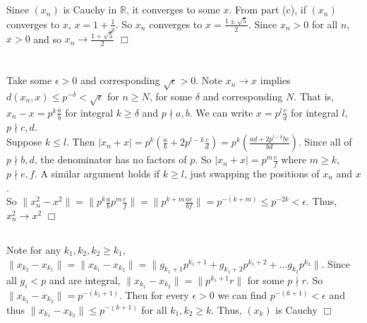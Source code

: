 \documentclass{article}
\begin{document}
\subsection{}
Since $(x_n)$ is Cauchy in $\mathbb{R}$, it converges to some $x$. From part (c), if $(x_n)$ converges to $x$, $x = 1 + \frac{1}{x}$. So $x_n$ converges to $x = \frac{1 \pm \sqrt{5}}{2}$. Since $x_n > 0$ for all $n$, $x>0$ and so $x_n \rightarrow \frac{1+\sqrt{5}}{2}$ $\Box$

\section{}
\subsection{}
Take some $\epsilon > 0$ and corresponding $\sqrt{\epsilon} > 0$. Note $x_n \rightarrow x$ implies $d(x_n,x) \leq p^{-\delta} < \sqrt{\epsilon}$ for $n\geq N$, for some $\delta$ and corresponding $N$. That is, $x_n-x = p^k\frac{a}{b}$ for integral $k\geq \delta$ and $p\nmid a,b$. We can write $x = p^l\frac{c}{d}$ for integral $l$, $p \nmid c,d$.\\
Suppose $k\leq l$. Then $|x_n+x| = p^k(\frac{a}{b} + 2p^{l-k}\frac{c}{d}) = p^k(\frac{ad + 2p^{l-k}bc}{bd})$. Since all of $p\nmid b,d$, the denominator has no factors of $p$. So $|x_n+x| = p^m\frac{e}{f}$ where $m\geq k$, $p \nmid e,f$. A similar argument holds if $k\geq l$, just swapping the positions of $x_n$ and $x$.\\
So $\|x_n^2 - x^2\| = \|p^k\frac{a}{b}p^m\frac{e}{f}\| = \|p^{k+m}\frac{ae}{bf}\| = p^{-(k+m)}\leq p^{-2k} < \epsilon$. Thus, $x_n^2 \rightarrow x^2$ $\Box$

\subsection{}
Note for any $k_1,k_2,k_2\geq k_1$, $\|x_{k_2} - x_{k_1}\| = \|x_{k_1} - x_{k_2}\| = \|g_{k_1+1}p^{k_1+1} + g_{k_1+2}p^{k_1+2} + \dots g_{k_2}p^{k_2}\|$. Since all $g_i<p$ and are integral, $\|x_{k_1} - x_{k_2}\| = \|p^{k_1+1}r\|$ for some $p\nmid r$. So $\|x_{k_1} - x_{k_2}\| = p^{-(k_1+1)}$. Then for every $\epsilon > 0$ we can find $p^{-(k+1)} < \epsilon$ and thus $\|x_{k_1} - x_{k_2}\| \leq p^{-(k+1)}$ for all $k_1,k_2\geq k$. Thus, $(x_k)$ is Cauchy $\Box$
\end{document}
